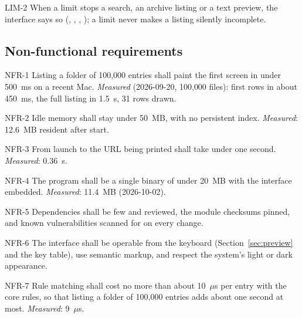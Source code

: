 \begin{req}{LIM-2}
When a limit stops a search, an archive listing or a text preview, the interface says
so (, , , ); a limit never makes a listing
silently incomplete.
\end{req}

\subsection{Non-functional requirements}

\begin{req}{NFR-1}
Listing a folder of 100{,}000 entries shall paint the first screen in under 500~ms on
a recent Mac.  \emph{Measured} (2026-09-20, 100{,}000 files): first rows in about
450~ms, the full listing in 1.5~s, 31 rows drawn.
\end{req}

\begin{req}{NFR-2}
Idle memory shall stay under 50~MB, with no persistent index.  \emph{Measured}:
12.6~MB resident after start.
\end{req}

\begin{req}{NFR-3}
From launch to the URL being printed shall take under one second.  \emph{Measured}:
0.36~s.
\end{req}

\begin{req}{NFR-4}
The program shall be a single binary of under 20~MB with the interface embedded.
\emph{Measured}: 11.4~MB (2026-10-02).
\end{req}

\begin{req}{NFR-5}
Dependencies shall be few and reviewed, the module checksums pinned, and known
vulnerabilities scanned for on every change.
\end{req}

\begin{req}{NFR-6}
The interface shall be operable from the keyboard (Section~\ref{sec:preview} and the
key table), use semantic markup, and respect the system's light or dark appearance.
\end{req}

\begin{req}{NFR-7}
Rule matching shall cost no more than about 10~$\mu$s per entry with the core rules,
so that listing a folder of 100{,}000 entries adds about one second at most.
\emph{Measured}: 9~$\mu$s.
\end{req}
